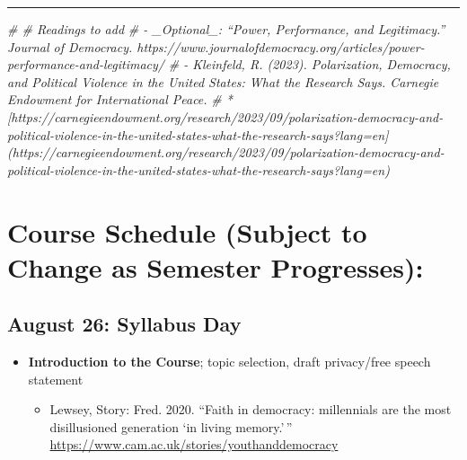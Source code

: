 \documentclass[]{tufte-handout}
\newenvironment{Shaded}{}{}
\newcommand{\CommentTok}[1]{\textcolor[rgb]{0.38,0.63,0.69}{\textit{#1}}}
\providecommand{\tightlist}{%
  \setlength{\itemsep}{0pt}\setlength{\parskip}{0pt}}
\begin{document}
\begin{center}\rule{0.5\linewidth}{0.5pt}\end{center}

\begin{Shaded}
\begin{Highlighting}[]
\CommentTok{\# \# Readings to add}
\CommentTok{\# {-} \_Optional\_: “Power, Performance, and Legitimacy.” Journal of Democracy. https://www.journalofdemocracy.org/articles/power{-}performance{-}and{-}legitimacy/}
\CommentTok{\# {-} Kleinfeld, R. (2023). Polarization, Democracy, and Political Violence in the United States: What the Research Says. Carnegie Endowment for International Peace.}
\CommentTok{\#     * [https://carnegieendowment.org/research/2023/09/polarization{-}democracy{-}and{-}political{-}violence{-}in{-}the{-}united{-}states{-}what{-}the{-}research{-}says?lang=en](https://carnegieendowment.org/research/2023/09/polarization{-}democracy{-}and{-}political{-}violence{-}in{-}the{-}united{-}states{-}what{-}the{-}research{-}says?lang=en)}
\end{Highlighting}
\end{Shaded}

\hypertarget{course-schedule-subject-to-change-as-semester-progresses}{%
\section{Course Schedule (Subject to Change as Semester
Progresses):}\label{course-schedule-subject-to-change-as-semester-progresses}}

\hypertarget{august-26-syllabus-day}{%
\subsection{August 26: Syllabus Day}\label{august-26-syllabus-day}}

\begin{itemize}
\tightlist
\item
  \textbf{Introduction to the Course}; topic selection, draft
  privacy/free speech statement

  \begin{itemize}
  \tightlist
  \item
    Lewsey, Story: Fred. 2020. ``Faith in democracy: millennials are the
    most disillusioned generation `in living memory.'\,''
    \url{https://www.cam.ac.uk/stories/youthanddemocracy}
  \end{itemize}
\end{itemize}
\end{document}
